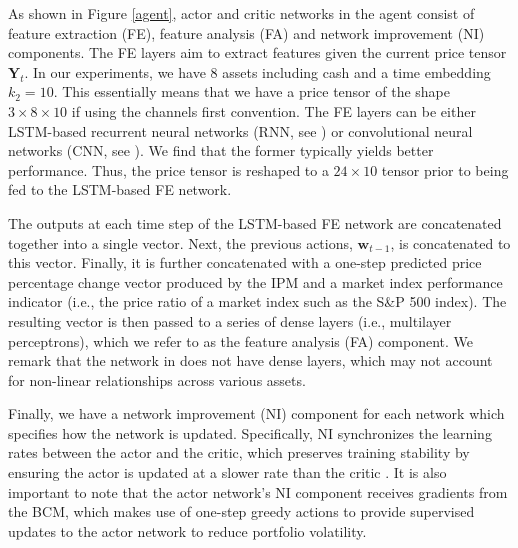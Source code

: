 \documentclass{article}
\begin{document}
As shown in Figure \ref{agent}, actor and critic networks in the agent consist of feature extraction (FE), feature analysis (FA) and network improvement (NI) components. The FE layers aim to extract features given the current price tensor $\mathbf{Y}_t$. In our experiments, we have $8$ assets including cash and a time embedding $k_2=10$. This essentially means that we have a price tensor of the shape $3\times8\times10$ if using the channels first convention.  The FE layers can be either LSTM-based recurrent neural networks (RNN, see \cite{hochreiter1997long}) or convolutional neural networks (CNN, see \cite{krizhevsky2012imagenet}). We find that the former typically yields better performance. Thus, the price tensor is reshaped to a $24\times10$ tensor prior to being fed to the LSTM-based FE network. 

The outputs at each time step of the LSTM-based FE network are concatenated together into a single vector. Next, the previous actions, $\mathbf{w}_{t-1}$, is concatenated to this vector. Finally, it is further concatenated with a one-step predicted price percentage change vector produced by the IPM and a market index performance indicator (i.e., the price ratio of a market index such as the S\&P 500 index). The resulting vector is then passed to a series of dense layers (i.e., multilayer perceptrons), which we refer to as the feature analysis (FA) component. We remark that the network in \cite{jiang2017deep} does not have dense layers, which may not account for non-linear relationships across various assets.

Finally, we have a network improvement (NI) component for each network which specifies how the network is updated. Specifically, NI synchronizes the learning rates between the actor and the critic, which preserves training stability by ensuring the actor is updated at a slower rate than the critic \cite{bhatnagar2009natural}. It is also important to note that the actor network's NI component receives gradients from the BCM, which makes use of one-step greedy actions to provide supervised updates to the actor network to reduce portfolio volatility. 
\end{document}
